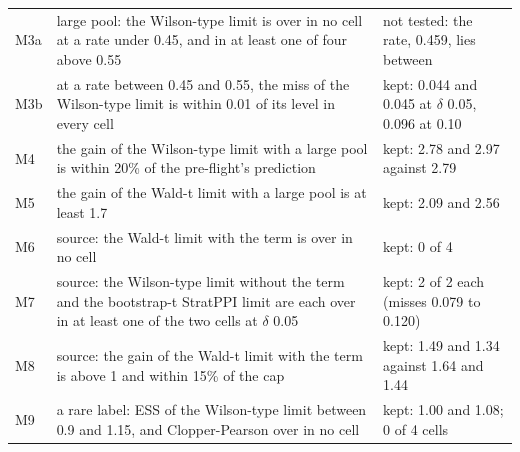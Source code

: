 \begin{tabular}{@{}l p{7.4cm} p{7.4cm}@{}}
M3a & large pool: the Wilson-type limit is over in no cell at a rate under 0.45, and in at least one of four above 0.55 & not tested: the rate, 0.459, lies between \\
M3b & at a rate between 0.45 and 0.55, the miss of the Wilson-type limit is within 0.01 of its level in every cell & kept: 0.044 and 0.045 at $\delta$ 0.05, 0.096 at 0.10 \\
M4 & the gain of the Wilson-type limit with a large pool is within 20\% of the pre-flight's prediction & kept: 2.78 and 2.97 against 2.79 \\
M5 & the gain of the Wald-t limit with a large pool is at least 1.7 & kept: 2.09 and 2.56 \\
M6 & source: the Wald-t limit with the term is over in no cell & kept: 0 of 4 \\
M7 & source: the Wilson-type limit without the term and the bootstrap-t StratPPI limit are each over in at least one of the two cells at $\delta$ 0.05 & kept: 2 of 2 each (misses 0.079 to 0.120) \\
M8 & source: the gain of the Wald-t limit with the term is above 1 and within 15\% of the cap & kept: 1.49 and 1.34 against 1.64 and 1.44 \\
M9 & a rare label: ESS of the Wilson-type limit between 0.9 and 1.15, and Clopper-Pearson over in no cell & kept: 1.00 and 1.08; 0 of 4 cells \\
\bottomrule
\end{tabular}
